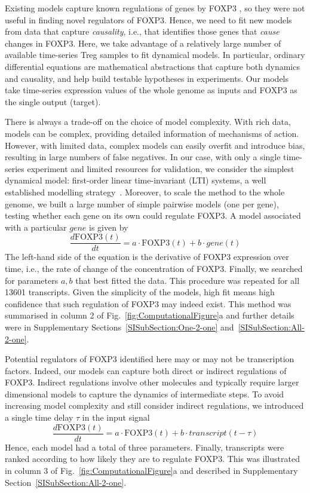 \documentclass[oneside, 10pt, a4paper, twocolumn]{article}
\begin{document}
Existing models capture known regulations 
of genes by FOXP3 \citep{VanDenHam2008, Hong2011, Carbo2013, Carbo2015}, so they were not useful in finding novel regulators of FOXP3. Hence, we need to fit new models from data that capture {\em causality}, i.e., that identifies those genes that {\em cause} changes in FOXP3. Here, we take advantage of a relatively large number of available time-series Treg samples to fit dynamical models. In particular, ordinary differential equations are mathematical abstractions that capture both dynamics and causality, and help build testable hypotheses in experiments. Our models take time-series expression values of the whole genome as inputs and FOXP3 as the single output (target). 

There is always a trade-off on the choice of model complexity. With rich data, models can be complex, providing detailed information of mechanisms of action. However, with limited data, complex models can easily overfit and introduce bias, resulting in large numbers of false negatives. In our case, with only a single time-series experiment and limited resources for validation, we consider the simplest dynamical model: first-order linear time-invariant (LTI) systems, a well established modelling strategy~\citep{Mombaerts2019, Muller2019,Dalchau2012, Herrero2012, Mombaerts2016}.
Moreover, to scale the method to the whole genome, we built a large number of simple  pairwise models (one per gene), testing whether each gene on its own could regulate FOXP3. A model associated with a particular $gene$ is given by
$$\frac{d \mbox{FOXP3}(t)}{dt} = a \cdot \mbox{FOXP3}(t) + b\cdot gene(t)$$
The left-hand side of the equation is the derivative of FOXP3 expression over time, i.e., the rate of change of the concentration of FOXP3. Finally, we searched for parameters $a,b$ that best fitted the data. This procedure was repeated for all 
13601 transcripts. Given the simplicity of the models, high fit means high confidence that such regulation of FOXP3 may indeed exist. 
This method was summarised in column 2 of Fig.~\ref{fig:ComputationalFigure}a and further details were in Supplementary Sections~\ref{SISubSection:One-2-one} and~\ref{SISubSection:All-2-one}.

Potential regulators of FOXP3 identified here may or may not be transcription factors. Indeed, our models can capture both direct or indirect regulations of FOXP3. 
Indirect regulations involve other molecules and typically require larger dimensional models to capture the dynamics of intermediate steps. To avoid increasing model complexity and still consider indirect regulations, we introduced a single time delay $\tau$ in the input signal
$$\frac{d \mbox{FOXP3}(t)}{dt} = a \cdot \mbox{FOXP3}(t) + b\cdot transcript(t-\tau)$$
Hence, each model had a total of three parameters. Finally, transcripts 
were ranked according to how likely they are to regulate FOXP3. This was illustrated in column 3 of Fig.~\ref{fig:ComputationalFigure}a and described in Supplementary Section~\ref{SISubSection:All-2-one}. 
\end{document}

